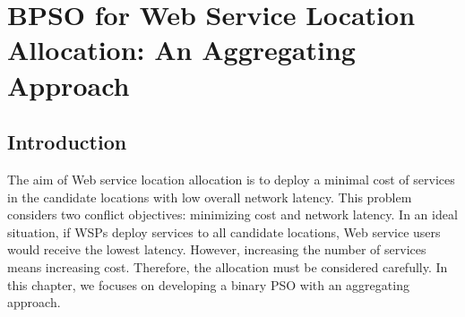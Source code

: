 % 
% 
% 
% 




\chapter{BPSO for Web Service Location Allocation: An Aggregating Approach}
\label{C:single}

\section{Introduction}
\label{sec:modelintro}

The aim of Web service location allocation is to deploy a minimal cost of services in the candidate locations with low overall network latency. 
This problem considers two conflict objectives: minimizing cost and network latency. In an ideal situation, if WSPs deploy services to all candidate
locations, Web service users would receive the lowest latency. However, increasing the number of services means increasing cost. Therefore, the allocation must be considered
carefully. In this chapter, we focuses on developing a binary PSO with an aggregating approach.


